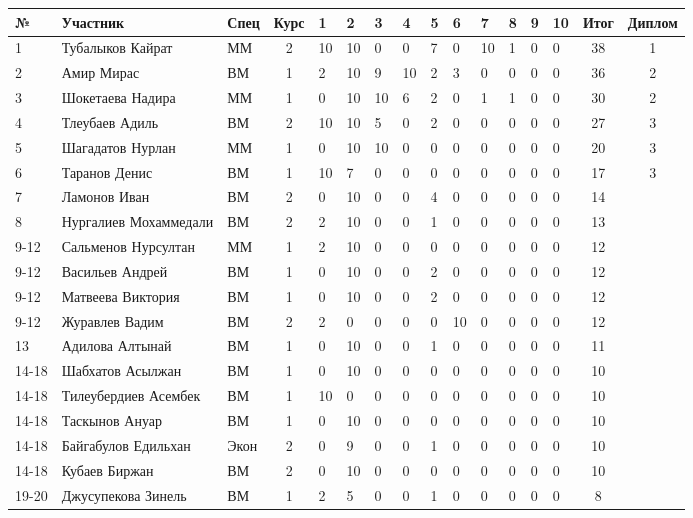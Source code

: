 \begin{tabular}{|l|l|l|c|*{10}{p{0.3cm}|}c|c|}
\hline
№ & Участник & Спец & Курс & 1 & 2 & 3 & 4 & 5 & 6 & 7 & 8 & 9 & 10 & Итог & Диплом\\
\hline
1 & Тубалыков Кайрат &  ММ & 2 & 10 & 10 & 0 & 0 & 7 & 0 & 10 & 1 & 0 & 0 & 38 & 1\\
\hline
2 & Амир Мирас &  ВМ & 1 & 2 & 10 & 9 & 10 & 2 & 3 & 0 & 0 & 0 & 0 & 36 & 2\\
\hline
3 & Шокетаева Надира &  ММ & 1 & 0 & 10 & 10 & 6 & 2 & 0 & 1 & 1 & 0 & 0 & 30 & 2\\
\hline
4 & Тлеубаев Адиль &  ВМ & 2 & 10 & 10 & 5 & 0 & 2 & 0 & 0 & 0 & 0 & 0 & 27 & 3\\
\hline
5 & Шагадатов Нурлан &  ММ & 1 & 0 & 10 & 10 & 0 & 0 & 0 & 0 & 0 & 0 & 0 & 20 & 3\\
\hline
6 & Таранов Денис &  ВМ & 1 & 10 & 7 & 0 & 0 & 0 & 0 & 0 & 0 & 0 & 0 & 17 & 3\\
\hline
7 & Ламонов Иван &  ВМ & 2 & 0 & 10 & 0 & 0 & 4 & 0 & 0 & 0 & 0 & 0 & 14 & \\
\hline
8 & Нургалиев Мохаммедали &  ВМ & 2 & 2 & 10 & 0 & 0 & 1 & 0 & 0 & 0 & 0 & 0 & 13 & \\
\hline
9-12 & Сальменов Нурсултан &  ММ & 1 & 2 & 10 & 0 & 0 & 0 & 0 & 0 & 0 & 0 & 0 & 12 & \\
\hline
9-12 & Васильев Андрей &  ВМ & 1 & 0 & 10 & 0 & 0 & 2 & 0 & 0 & 0 & 0 & 0 & 12 & \\
\hline
9-12 & Матвеева Виктория &  ВМ & 1 & 0 & 10 & 0 & 0 & 2 & 0 & 0 & 0 & 0 & 0 & 12 & \\
\hline
9-12 & Журавлев Вадим &  ВМ & 2 & 2 & 0 & 0 & 0 & 0 & 10 & 0 & 0 & 0 & 0 & 12 & \\
\hline
13 & Адилова Алтынай &  ВМ & 1 & 0 & 10 & 0 & 0 & 1 & 0 & 0 & 0 & 0 & 0 & 11 & \\
\hline
14-18 & Шабхатов Асылжан &  ВМ & 1 & 0 & 10 & 0 & 0 & 0 & 0 & 0 & 0 & 0 & 0 & 10 & \\
\hline
14-18 & Тилеубердиев Асембек &  ВМ & 1 & 10 & 0 & 0 & 0 & 0 & 0 & 0 & 0 & 0 & 0 & 10 & \\
\hline
14-18 & Таскынов Ануар &  ВМ & 1 & 0 & 10 & 0 & 0 & 0 & 0 & 0 & 0 & 0 & 0 & 10 & \\
\hline
14-18 & Байгабулов Едильхан &  Экон & 2 & 0 & 9 & 0 & 0 & 1 & 0 & 0 & 0 & 0 & 0 & 10 & \\
\hline
14-18 & Кубаев Биржан &  ВМ & 2 & 0 & 10 & 0 & 0 & 0 & 0 & 0 & 0 & 0 & 0 & 10 & \\
\hline
19-20 & Джусупекова Зинель &  ВМ & 1 & 2 & 5 & 0 & 0 & 1 & 0 & 0 & 0 & 0 & 0 & 8 & \\

\end{tabular}
